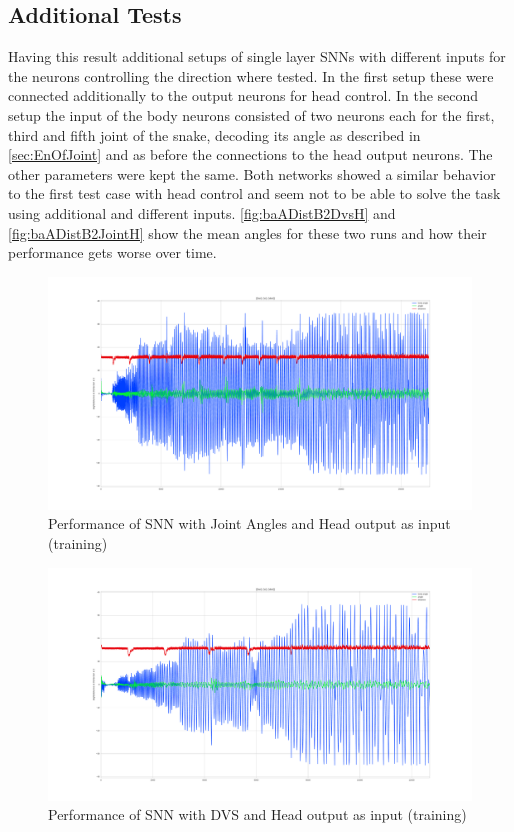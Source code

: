 \subsection{Additional Tests}
Having this result additional setups of single layer SNNs with different inputs for the neurons controlling the direction where tested. In the first setup these were connected additionally to the output neurons for head control. In the second setup the input of the body neurons consisted of two neurons each for the first, third and fifth joint of the snake, decoding its angle as described in \autoref{sec:EnOfJoint} and as before the connections to the head output neurons. The other parameters were kept the same.
Both networks showed a similar behavior to the first test case with head control and seem not to be able to solve the task using additional and different inputs. \autoref{fig:baADistB2DvsH} and \autoref{fig:baADistB2JointH} show the mean angles for these two runs and how their performance gets worse over time.

\begin{figure}[htpb]
  \centering
  \includegraphics[width=\textwidth]{figures/plots/baADistB2JointH}
  \caption{ Performance of SNN with Joint Angles and Head output as input (training) }
  \label{fig:baADistB2JointH}
\end{figure}
\begin{figure}[htpb]
  \centering
  \includegraphics[width=\textwidth]{figures/plots/baADistB2DvsH}
  \caption{ Performance of SNN with DVS and Head output as input (training)  }
  \label{fig:baADistB2DvsH}
\end{figure}

